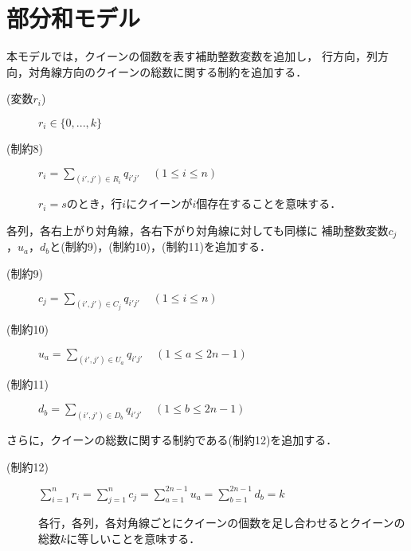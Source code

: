 \section{部分和モデル}
本モデルでは，クイーンの個数を表す補助整数変数を追加し，
行方向，列方向，対角線方向のクイーンの総数に関する制約を追加する．
\begin{description}
 \item[(変数$r_i$)] $r_{i} \in \{0,...,k\}$ 
 \item[(制約8)] $r_{i} = \sum\limits _{(i',j') \in R_{i}} q_{i'j'} \;\;\;\;(1 \leq i \leq n)$ \par
$r_i = s$のとき，行$i$にクイーンが$i$個存在することを意味する．
\end{description}
%
各列，各右上がり対角線，各右下がり対角線に対しても同様に
補助整数変数$c_j$，$u_{a}$，$d_{b}$と(制約9)，(制約10)，(制約11)を追加する．
%
\begin{description}
 \item[(制約9)] $c_{j} = \sum\limits _{(i',j') \in C_{j}} q_{i'j'} \;\;\;\;(1 \leq i \leq n)$
 \item[(制約10)] $u_{a} = \sum\limits _{(i',j') \in U_{a}} q_{i'j'} \;\;\;\;(1 \leq a \leq 2n-1)$
 \item[(制約11)] $d_{b} = \sum\limits _{(i',j') \in D_{b}} q_{i'j'} \;\;\;\;(1 \leq b \leq 2n-1)$
\end{description}
さらに，クイーンの総数に関する制約である(制約12)を追加する．
\begin{description}
 \item[(制約12)] $\sum\limits_{i=1}^{n} r_{i} = \sum\limits_{j=1}^{n} c_{j} =\sum\limits_{a=1}^{2n-1} u_{a} =\sum\limits_{b=1}^{2n-1} d_{b} = k$ \par
各行，各列，各対角線ごとにクイーンの個数を足し合わせるとクイーンの総数$k$に等しいことを意味する．
\end{description}